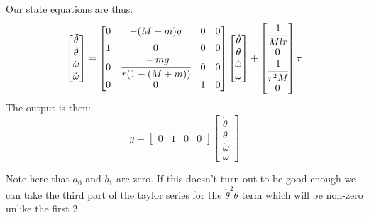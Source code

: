 \documentclass{article}
\begin{document}
Our state equations are thus:
\[\begin{bmatrix}\ddot{\theta}\\\dot{\theta}\\\ddot{\omega}\\\dot{\omega}\end{bmatrix}=\begin{bmatrix}0&-(M+m)g&0&0\\[0.5em]1&0&0&0\\0&\cfrac{-mg}{r(1-(M+m))}&0&0\\[0.5em]0&0&1&0\end{bmatrix}\begin{bmatrix}\dot{\theta}\\\theta\\\dot{\omega}\\\omega\end{bmatrix}+\begin{bmatrix}\cfrac{1}{Mlr}\\[0.5em]0\\\cfrac{1}{r^2M}\\[0.5em]0\end{bmatrix}\tau\]
The output is then:
\[y=\begin{bmatrix}0&1&0&0\end{bmatrix}\begin{bmatrix}\dot{\theta}\\\theta\\\dot{\omega}\\\omega\end{bmatrix}\]

Note here that $a_0$ and $b_1$ are zero. If this doesn't turn out to be good enough we can take the third part of the taylor series for the $\dot{\theta}^2\theta$ term which will be non-zero unlike the first 2.\\
\end{document}
